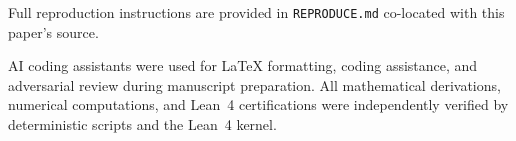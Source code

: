 \documentclass[11pt]{article}
\theoremstyle{remark}
\begin{document}
Full reproduction instructions are provided in \texttt{REPRODUCE.md} co-located with this paper's source.

AI coding assistants were used for LaTeX formatting, coding assistance, and adversarial review during manuscript preparation. All mathematical derivations, numerical computations, and Lean~4 certifications were independently verified by deterministic scripts and the Lean~4 kernel.



\end{document}
